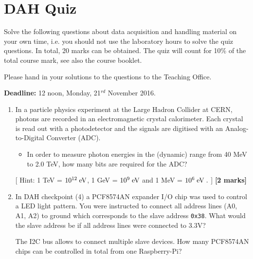 \chapter{DAH Quiz}
\label{sec:quiz}

Solve the following questions about data acquisition and handling material on your own time,
i.e. you should not use the laboratory hours to solve the quiz questions. 
In total, 20 marks can be obtained.
The quiz will count for 10\% of the total course mark, see also the course booklet. 

Please hand in your solutions to the questions to the Teaching Office.

{\bf Deadline:} 12 noon, Monday, 21$^{rd}$ November 2016.

\begin{enumerate}

\item  In a particle physics experiment at the Large Hadron Collider at CERN, photons  are recorded in an electromagnetic crystal calorimeter. Each crystal is read out with a photodetector and the signals
are  digitised with an Analog-to-Digital Converter (ADC).
%
\begin{itemize}
\item In order to measure photon  energies  in  the (dynamic) range  from 40 MeV to  2.0 TeV,
how many bits are required for the ADC? 
\end{itemize}
[ Hint: 1 TeV = $10^{12}\; \rm eV$, 1 GeV = $10^9\; \rm eV$ and 1 MeV = $10^6\; \rm eV\; .$ ]
%
\hfill {\bf [2 marks]}\\

\item In DAH checkpoint (4) a PCF8574AN expander I/O chip was used to control a LED light pattern.  You were instructed to connect all address lines (A0, A1, A2) to ground which corresponds to the slave address {\tt 0x38}. What would the slave address be if all address lines were connected to 3.3V? 

The I2C bus allows to connect multiple slave devices. How many PCF8574AN chips can be controlled in total from one Raspberry-Pi?


\end{enumerate}
